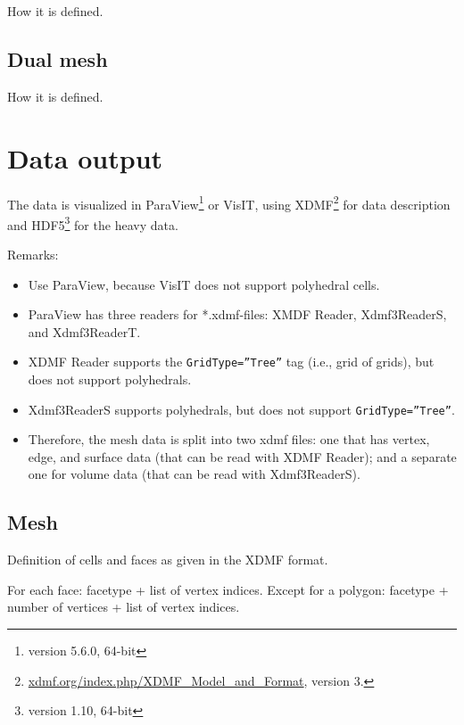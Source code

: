 \documentclass{article}
\begin{document}
How it is defined.



\subsection{Dual mesh}

How it is defined.



\section{Data output}

The data is visualized in ParaView\footnote{version 5.6.0, 64-bit} 
or VisIT, 
using XDMF\footnote{\url{xdmf.org/index.php/XDMF_Model_and_Format}, version 3.} 
for data description and HDF5\footnote{version 1.10, 64-bit} 
for the heavy data.

Remarks:
\begin{itemize}
\item Use ParaView, because VisIT does not support polyhedral cells.

\item ParaView has three readers for *.xdmf-files: XMDF Reader, Xdmf3ReaderS, and Xdmf3ReaderT. 

\item XDMF Reader supports the \texttt{GridType=''Tree''} tag (i.e., grid of grids), but does not support polyhedrals.

\item Xdmf3ReaderS supports polyhedrals, but does not support \texttt{GridType=''Tree''}.

\item Therefore, the mesh data is split into two xdmf files: one that has vertex, edge, and surface data (that can be read with XDMF Reader); and a separate one for volume data (that can be read with Xdmf3ReaderS).

\end{itemize}







\subsection{Mesh}

Definition of cells and faces as given in the XDMF format. 

For each face: facetype + list of vertex indices. Except for a polygon: facetype + number of vertices + list of vertex indices.
\end{document}
